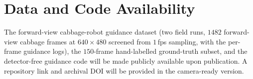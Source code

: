 \section*{Data and Code Availability}
\noindent The forward-view cabbage-robot guidance dataset (two field runs,
$1482$ forward-view cabbage frames at $640\times480$ screened from $1$\,fps sampling, with the per-frame
guidance logs), the $150$-frame hand-labelled ground-truth subset, and the
detector-free guidance code will be made publicly available upon publication. A
repository link and archival DOI will be provided in the camera-ready version.
